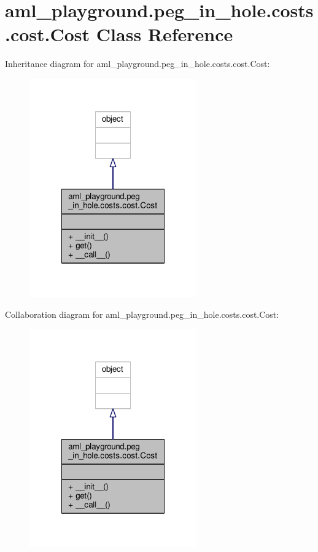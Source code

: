 \hypertarget{classaml__playground_1_1peg__in__hole_1_1costs_1_1cost_1_1_cost}{\section{aml\-\_\-playground.\-peg\-\_\-in\-\_\-hole.\-costs.\-cost.\-Cost Class Reference}
\label{classaml__playground_1_1peg__in__hole_1_1costs_1_1cost_1_1_cost}
}


Inheritance diagram for aml\-\_\-playground.\-peg\-\_\-in\-\_\-hole.\-costs.\-cost.\-Cost\-:\nopagebreak
\begin{figure}[H]
\begin{center}
\leavevmode
\includegraphics[width=204pt]{classaml__playground_1_1peg__in__hole_1_1costs_1_1cost_1_1_cost__inherit__graph}
\end{center}
\end{figure}


Collaboration diagram for aml\-\_\-playground.\-peg\-\_\-in\-\_\-hole.\-costs.\-cost.\-Cost\-:\nopagebreak
\begin{figure}[H]
\begin{center}
\leavevmode
\includegraphics[width=204pt]{classaml__playground_1_1peg__in__hole_1_1costs_1_1cost_1_1_cost__coll__graph}
\end{center}
\end{figure}
